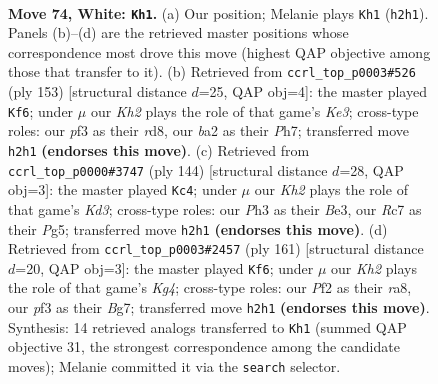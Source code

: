 \documentclass[11pt]{article}
\begin{document}
\clearpage

\begin{figure}[p]\centering
\begin{subfigure}{0.46\textwidth}\centering
\resizebox{\linewidth}{!}{%
\newchessgame
\chessboard[
  setfen={7k/B1R5/4r3/8/B3p2p/5p1P/b4P1K/8 w - - 58 74},
  showmover=false,
  pgfstyle=straightmove, color=movearrow, markmove={h2-h1}
]}
\caption{}
\end{subfigure}\hfill
\begin{subfigure}{0.46\textwidth}\centering
\resizebox{\linewidth}{!}{%
\newchessgame
\chessboard[
  setfen={3R4/2r4p/1p2k3/1Bb2p1P/P1P2P2/7K/8/8 b - - 74 77},
  showmover=false,
  pgfstyle=straightmove, color=movearrow, markmove={e6-f6}
]}
\caption{}
\end{subfigure}
\\[4pt]
\begin{subfigure}{0.46\textwidth}\centering
\resizebox{\linewidth}{!}{%
\newchessgame
\chessboard[
  setfen={8/7p/3k2pP/b3p1P1/4P3/3KB3/8/8 w - - 8 73},
  showmover=false,
  pgfstyle=straightmove, color=movearrow, markmove={d3-c4}
]}
\caption{}
\end{subfigure}\hfill
\begin{subfigure}{0.46\textwidth}\centering
\resizebox{\linewidth}{!}{%
\newchessgame
\chessboard[
  setfen={R7/1r4b1/3pP3/3P2k1/1p6/1Pp1K3/2B5/8 b - - 33 81},
  showmover=false,
  pgfstyle=straightmove, color=movearrow, markmove={g5-f6}
]}
\caption{}
\end{subfigure}
\caption{\textbf{Move 74, White: \texttt{Kh1}.} (a) Our position; Melanie plays \texttt{Kh1} (\texttt{h2h1}). Panels (b)--(d) are the retrieved master positions whose correspondence most drove this move (highest QAP objective among those that transfer to it). (b) Retrieved from \texttt{ccrl\_top\_p0003\#526} (ply 153) [structural distance $d$=25, QAP obj=4]: the master played \texttt{Kf6}; under $\mu$ our \emph{Kh2} plays the role of that game's \emph{Ke3}; cross-type roles: our \emph{p}f3 as their \emph{r}d8, our \emph{b}a2 as their \emph{P}h7; transferred move \texttt{h2h1} \textbf{(endorses this move)}. (c) Retrieved from \texttt{ccrl\_top\_p0000\#3747} (ply 144) [structural distance $d$=28, QAP obj=3]: the master played \texttt{Kc4}; under $\mu$ our \emph{Kh2} plays the role of that game's \emph{Kd3}; cross-type roles: our \emph{P}h3 as their \emph{B}e3, our \emph{R}c7 as their \emph{P}g5; transferred move \texttt{h2h1} \textbf{(endorses this move)}. (d) Retrieved from \texttt{ccrl\_top\_p0003\#2457} (ply 161) [structural distance $d$=20, QAP obj=3]: the master played \texttt{Kf6}; under $\mu$ our \emph{Kh2} plays the role of that game's \emph{Kg4}; cross-type roles: our \emph{P}f2 as their \emph{r}a8, our \emph{p}f3 as their \emph{B}g7; transferred move \texttt{h2h1} \textbf{(endorses this move)}. Synthesis: 14 retrieved analogs transferred to \texttt{Kh1} (summed QAP objective 31, the strongest correspondence among the candidate moves); Melanie committed it via the \texttt{search} selector.}
\label{fig:thought-m146}
\end{figure}
\end{document}
